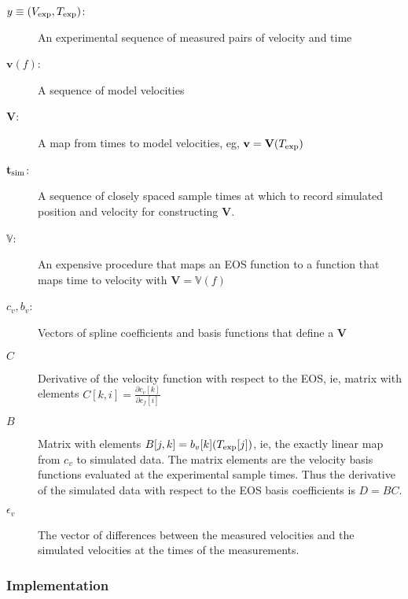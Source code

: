 \documentclass[11pt]{article}
\newcommand{\partiald}[2]{\frac{\partial #1}{\partial #2}}
\newcommand\bv{\mathbf{v}}
\newcommand{\eos}{f}
\newcommand\Vfunc{\mathbb{V}}
\newcommand\Vt{\mathbf{V}}
\newcommand\vexp{V_{\rm{exp}}}
\newcommand\texp{T_{\rm{exp}}}
\newcommand\cf{c_f}
\newcommand\cv{c_v}
\newcommand\vbasis{b_v}
\newcommand\tsim{{\mathbf t}_{\rm{sim}}}
\newcommand\epv{\epsilon_v}
\begin{document}
\begin{description}
\item[$y\equiv(\vexp, \texp)$:] An experimental sequence of measured pairs of
  velocity and time
\item[$\bv(\eos)$:] A sequence of model velocities
\item[$\Vt$:] A map from times to model velocities, eg, $\bv =
  \Vt(\texp)$
\item[$\tsim$:] A sequence of closely spaced sample times at which to record
  simulated position and velocity for constructing $\Vt$.
\item[$\Vfunc$:] An expensive procedure that maps an EOS function to a
  function that maps time to velocity with $\Vt = \Vfunc(\eos)$
\item[$\cv,\vbasis$:] Vectors of spline coefficients and basis functions
  that define a $\Vt$
\item[$C$] Derivative of the velocity function with respect to the
  EOS, ie, matrix with elements $C[k,i] = \partiald{\cv[k]}{\cf[i]}$
\item[$B$] Matrix with elements $B[j,k] = \vbasis[k](\texp[j])$, ie,
  the exactly linear map from $c_v$ to simulated data.  The matrix
  elements are the velocity basis functions evaluated at the
  experimental sample times.  Thus the derivative of the simulated
  data with respect to the EOS basis coefficients is $D = BC$.
\item[$\epv$] The vector of differences between the measured
  velocities and the simulated velocities at the times of the
  measurements.
\end{description}

\subsubsection{Implementation}
\label{sec:basic_implementation}
\end{document}
